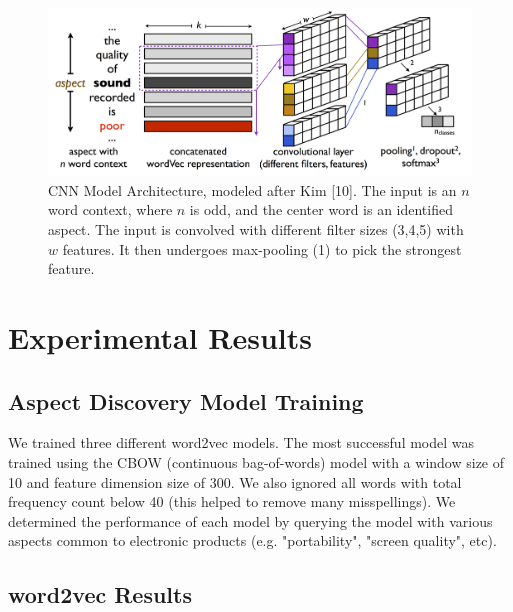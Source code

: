 \documentclass{article} %
\begin{document}
\begin{figure}[ht]
\begin{center}
\includegraphics[width=\columnwidth]{model_architecture.png}
\end{center}
\caption{CNN Model Architecture, modeled after Kim [10]. The input is an $n$ word context, where $n$ is odd, and the center word is an identified aspect. The input is convolved with different filter sizes (3,4,5) with $w$ features. It then undergoes max-pooling (1) to pick the strongest feature.}
\label{architecture}
\end{figure}


\section{Experimental Results} 

\subsection{Aspect Discovery Model Training} 

We trained three different word2vec models. The most successful model was trained using the CBOW (continuous bag-of-words) model with a window size of 10 and feature dimension size of 300. We also ignored all words with total frequency count below 40 (this helped to remove many misspellings). We determined the performance of each model by querying the model with various aspects common to electronic products (e.g. "portability", "screen quality", etc).

\subsection{word2vec Results}
\end{document}
